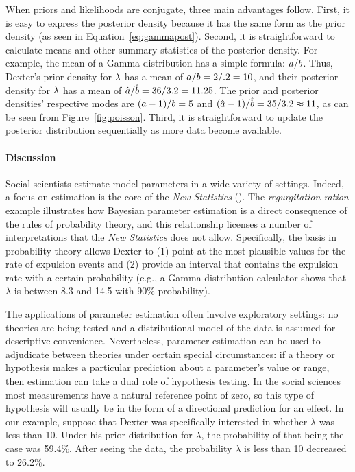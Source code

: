 When priors and likelihoods are conjugate, three main advantages follow. First, it is easy to express the posterior density because it has the same form as the prior density (as seen in Equation~\ref{eq:gammapost}). Second, it is straightforward to calculate means and other summary statistics of the posterior density. For example, the mean of a Gamma distribution has a simple formula: $a/b$. Thus, Dexter's prior density for $\lambda$ has a mean of $a/b=2/.2=10$, and their posterior density for $\lambda$ has a mean of $\hat{a}/\hat{b} = 36/3.2 = 11.25$. The prior and posterior densities' respective modes are $(a-1)/b=5$ and $(\hat{a}-1)/\hat{b} = 35/3.2 \approx 11$, as can be seen from Figure~\ref{fig:poisson}. Third, it is straightforward to  update the posterior distribution sequentially as more data become available.

\paragraph{Discussion}  Social scientists estimate model parameters in a wide variety of settings. Indeed, a focus on estimation is the core of the \emph{New Statistics} (). The \emph{regurgitation ration} example illustrates how Bayesian parameter estimation is a direct consequence of the rules of probability theory, and this relationship licenses a number of interpretations that the \emph{New Statistics} does not allow. Specifically, the basis in probability theory allows Dexter to (1) point at the most plausible values for the rate of expulsion events and (2) provide an interval that contains the expulsion rate with a certain probability (e.g., a Gamma distribution calculator shows that $\lambda$ is between 8.3 and 14.5 with 90\% probability).

The applications of parameter estimation often involve exploratory settings: no theories are being tested and a distributional model of the data is assumed for descriptive convenience.  Nevertheless, parameter estimation can be used to adjudicate between theories under certain special circumstances: if a theory or hypothesis makes a particular prediction about a parameter's value or range, then estimation can take a dual role of hypothesis testing. In the social sciences most measurements have a natural reference point of zero, so this type of hypothesis will usually be in the form of a directional prediction for an effect. In our example, suppose that Dexter was specifically interested in whether $\lambda$ was less than 10.  Under his prior distribution for $\lambda$, the probability of that being the case was 59.4\%.  After seeing the data, the probability $\lambda$ is less than 10 decreased to 26.2\%.

